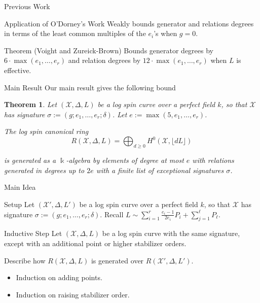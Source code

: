 \documentclass{beamer}
\newtheorem{thm}{Theorem}
\theoremstyle{remark}
\newcommand \sx{{\mathscr X}}
\newcommand{\halfcan}{L}
\newcommand\Bk{{\Bbbk}}
\begin{document}

\begin{frame}{Previous Work}
\begin{block}{Application of O'Dorney's Work}
Weakly bounds generator and relations degrees in terms of
the least common multiples of the $e_i$'s when $g = 0$.
\end{block}

\begin{block}{Theorem (Voight and Zureick-Brown)}
Bounds generator degrees by $6
\cdot \max(e_1, \ldots, e_r)$ and relation degrees by $12 \cdot \max
(e_1, \ldots, e_ r)$ when $\halfcan$ is effective.
\end{block}

\end{frame}


\begin{frame}{Main Result}
Our main result gives the following bound

\begin{thm}
\label{thm:main}
Let $(\sx, \Delta, \halfcan)$ be a log spin curve over a perfect
field $k$, so that $\sx$ has signature $\sigma := (g; e_1, \ldots,
e_r; \delta)$. Let $e := \max(5, e_1, \ldots, e_r)$.

The log spin canonical ring 
\[
	R(\sx, \Delta, \halfcan) = \bigoplus_{d \geq 0} H^0(\sx, \lfloor d \halfcan \rfloor)
\]

\noindent
is generated as a $\Bk$-algebra by elements of degree at most $e$ with
relations generated in degrees up to $2e$ with a finite list of exceptional
signatures $\sigma$.
\end{thm}
\end{frame}


\begin{frame}{Main Idea}
\begin{block}{Setup}
Let $(\sx', \Delta, \halfcan')$ be a log spin curve over a perfect
field $k$, so that $\sx$ has signature $\sigma := (g; e_1, \ldots,
e_r; \delta)$. Recall $\halfcan \sim \sum_{i = 1}^{r} \frac{e_i - 1}{2e_i} P_i
+ \sum_{j = 1}^{\ell} P_\ell$.
\end{block}

\begin{block}{Inductive Step}
Let $(\sx, \Delta, \halfcan)$ be a log spin curve with the same
signature, except with an additional point or higher stabilizer
orders.

Describe how $R(\sx, \Delta, \halfcan)$ is generated over
$R(\sx', \Delta, \halfcan')$.
\end{block}

\begin{itemize}
\item Induction on adding points. \\
\item Induction on raising stabilizer order. \\
\end{itemize}
\end{frame}
\end{document}
